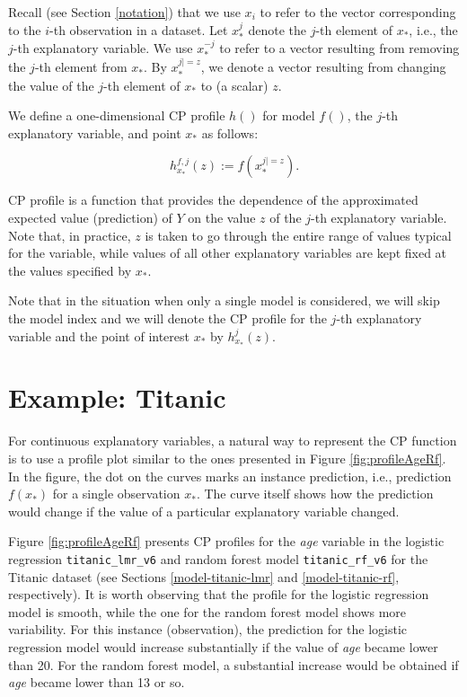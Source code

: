 \documentclass[]{krantz}
\begin{document}
Recall (see Section \ref{notation}) that we use \(x_i\) to refer to the vector corresponding to the \(i\)-th observation in a dataset. Let \(x^{j}_{*}\) denote the \(j\)-th element of \(x_{*}\), i.e., the \(j\)-th explanatory variable. We use \(x^{-j}_{*}\) to refer to a vector resulting from removing the \(j\)-th element from \(x_{*}\). By \(x^{j|=z}_{*}\), we denote a vector resulting from changing the value of the \(j\)-th element of \(x_{*}\) to (a scalar) \(z\).

We define a one-dimensional CP profile \(h()\) for model \(f()\), the \(j\)-th explanatory variable, and point \(x_*\) as follows:

\begin{equation}
h^{f,j}_{x_*}(z) := f(x_*^{j|=z}).
\label{eq:CPPdef}
\end{equation}

CP profile is a function that provides the dependence of the approximated expected value (prediction) of \(Y\) on the value \(z\) of the \(j\)-th explanatory variable. Note that, in practice, \(z\) is taken to go through the entire range of values typical for the variable, while values of all other explanatory variables are kept fixed at the values specified by \(x_*\).

Note that in the situation when only a single model is considered, we will skip the model index and we will denote the CP profile for the \(j\)-th explanatory variable and the point of interest \(x_*\) by \(h^{j}_{x_*}(z)\).

\hypertarget{CPExample}{%
\section{Example: Titanic}\label{CPExample}}

For continuous explanatory variables, a natural way to represent the CP function is to use a profile plot similar to the ones presented in Figure \ref{fig:profileAgeRf}. In the figure, the dot on the curves marks an instance prediction, i.e., prediction \(f(x_*)\) for a single observation \(x_*\). The curve itself shows how the prediction would change if the value of a particular explanatory variable changed.

Figure \ref{fig:profileAgeRf} presents CP profiles for the \emph{age} variable in the logistic regression \texttt{titanic\_lmr\_v6} and random forest model \texttt{titanic\_rf\_v6} for the Titanic dataset (see Sections \ref{model-titanic-lmr} and \ref{model-titanic-rf}, respectively). It is worth observing that the profile for the logistic regression model is smooth, while the one for the random forest model shows more variability. For this instance (observation), the prediction for the logistic regression model would increase substantially if the value of \emph{age} became lower than 20. For the random forest model, a substantial increase would be obtained if \emph{age} became lower than 13 or so.
\end{document}
